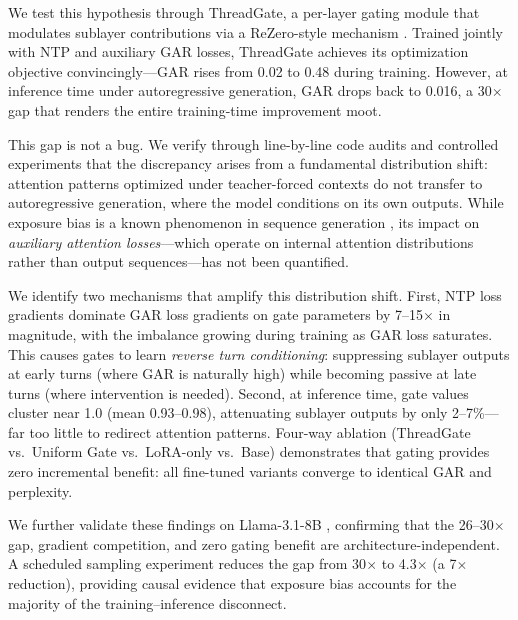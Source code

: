 \documentclass[11pt]{article}
\begin{document}
We test this hypothesis through ThreadGate, a per-layer gating module that modulates sublayer contributions via a ReZero-style mechanism \citep{bachlechner2021rezero}. Trained jointly with NTP and auxiliary GAR losses, ThreadGate achieves its optimization objective convincingly---GAR rises from 0.02 to 0.48 during training. However, at inference time under autoregressive generation, GAR drops back to 0.016, a 30$\times$ gap that renders the entire training-time improvement moot.

This gap is not a bug. We verify through line-by-line code audits and controlled experiments that the discrepancy arises from a fundamental distribution shift: attention patterns optimized under teacher-forced contexts do not transfer to autoregressive generation, where the model conditions on its own outputs. While exposure bias is a known phenomenon in sequence generation \citep{bengio2015scheduled, lamb2016professor}, its impact on \emph{auxiliary attention losses}---which operate on internal attention distributions rather than output sequences---has not been quantified.

We identify two mechanisms that amplify this distribution shift. First, NTP loss gradients dominate GAR loss gradients on gate parameters by 7--15$\times$ in magnitude, with the imbalance growing during training as GAR loss saturates. This causes gates to learn \emph{reverse turn conditioning}: suppressing sublayer outputs at early turns (where GAR is naturally high) while becoming passive at late turns (where intervention is needed). Second, at inference time, gate values cluster near 1.0 (mean 0.93--0.98), attenuating sublayer outputs by only 2--7\%---far too little to redirect attention patterns. Four-way ablation (ThreadGate vs.\ Uniform Gate vs.\ LoRA-only vs.\ Base) demonstrates that gating provides zero incremental benefit: all fine-tuned variants converge to identical GAR and perplexity.

We further validate these findings on Llama-3.1-8B \citep{dubey2024llama3}, confirming that the 26--30$\times$ gap, gradient competition, and zero gating benefit are architecture-independent. A scheduled sampling experiment \citep{bengio2015scheduled} reduces the gap from 30$\times$ to 4.3$\times$ (a 7$\times$ reduction), providing causal evidence that exposure bias accounts for the majority of the training--inference disconnect.
\end{document}
